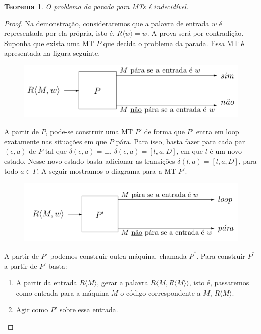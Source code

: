 \documentclass[a4paper]{article}
\newtheorem{Theorem}{Teorema}
\theoremstyle{definition}
\begin{document}
  \begin{Theorem}
    O problema da parada para MTs é indecidível.
  \end{Theorem}
  \begin{proof}
    Na demonstração, consideraremos que a palavra de entrada $w$ é representada
    por ela própria, isto é, $R\langle w \rangle = w$. A prova será por
    contradição.
    Suponha que exista uma MT $P$ que decida o problema da parada. Essa MT é
    apresentada na figura seguinte.
    \begin{figure}[H]
      \includegraphics[scale=.4]{MTP.png}
      \centering
    \end{figure}
    A partir de $P$, pode-se construir uma MT $P'$ de forma que $P'$ entra em
    loop exatamente nas situações em que $P$ pára. Para isso, basta fazer
    para cada par $(e,a)$ de $P$ tal que $\delta(e,a) = \bot$,
    $\delta(e,a) = [l,a,D]$, em que $l$ é um novo estado. Nesse novo estado
    basta adicionar as transições $\delta(l,a)=[l,a,D]$, para todo $a \in
    \Gamma$. A seguir mostramos o diagrama para a MT $P'$.
    \begin{figure}[H]
      \includegraphics[scale=.4]{MTP1.png}
      \centering
    \end{figure}
    A partir de $P'$ podemos construir outra máquina, chamada $P^{''}$. Para
    construir $P^{''}$ a partir de $P'$ basta:
    \begin{enumerate}
      \item A partir da entrada $R\langle M \rangle$, gerar a palavra $R\langle
        M, R\langle M \rangle \rangle$, isto é, passaremos como entrada para a
        máquina $M$ o código correspondente a $M$, $R\langle M \rangle$.
      \item Agir como $P'$ sobre essa entrada.
    \end{enumerate}

\end{proof}
\end{document}
